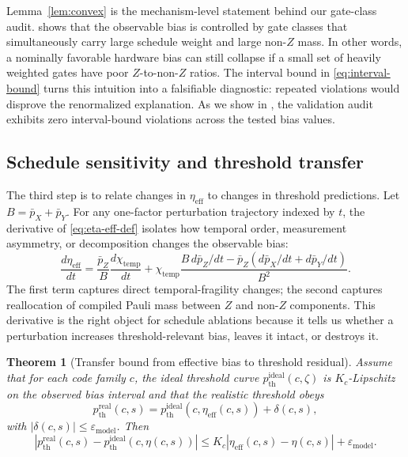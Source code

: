 \documentclass{article} %
\newtheorem{theorem}{Theorem}[section]
\begin{document}
Lemma~\ref{lem:convex} is the mechanism-level statement behind our gate-class audit.  shows that the observable bias is controlled by gate classes that simultaneously carry large schedule weight and large non-$Z$ mass. In other words, a nominally favorable hardware bias can still collapse if a small set of heavily weighted gates have poor $Z$-to-non-$Z$ ratios. The interval bound in \eqref{eq:interval-bound} turns this intuition into a falsifiable diagnostic: repeated violations would disprove the renormalized explanation. As we show in , the validation audit exhibits zero interval-bound violations across the tested bias values.

\subsection{Schedule sensitivity and threshold transfer}

The third step is to relate changes in $\eta_{\mathrm{eff}}$ to changes in threshold predictions. Let $B = \bar p_X + \bar p_Y$. For any one-factor perturbation trajectory indexed by $t$, the derivative of \eqref{eq:eta-eff-def} isolates how temporal order, measurement asymmetry, or decomposition changes the observable bias:
\begin{equation}
\label{eq:sensitivity}
\frac{d\eta_{\mathrm{eff}}}{dt}
=
\frac{\bar p_Z}{B}\frac{d\chi_{\mathrm{temp}}}{dt}
+
\chi_{\mathrm{temp}}
\frac{
B\, d\bar p_Z/dt
-
\bar p_Z \left(d\bar p_X/dt + d\bar p_Y/dt\right)
}{
B^2
}.
\end{equation}
The first term captures direct temporal-fragility changes; the second captures reallocation of compiled Pauli mass between $Z$ and non-$Z$ components. This derivative is the right object for schedule ablations because it tells us whether a perturbation increases threshold-relevant bias, leaves it intact, or destroys it.

\begin{theorem}[Transfer bound from effective bias to threshold residual]
\label{thm:transfer}
Assume that for each code family $c$, the ideal threshold curve $p_{\mathrm{th}}^{\mathrm{ideal}}(c,\zeta)$ is $K_c$-Lipschitz on the observed bias interval and that the realistic threshold obeys
\begin{equation}
\label{eq:realistic-decomposition}
p_{\mathrm{th}}^{\mathrm{real}}(c,s)
=
p_{\mathrm{th}}^{\mathrm{ideal}}\!\left(c,\eta_{\mathrm{eff}}(c,s)\right)
+
\delta(c,s),
\end{equation}
with $|\delta(c,s)| \le \varepsilon_{\mathrm{model}}$. Then
\begin{equation}
\label{eq:transfer-bound}
\left|
p_{\mathrm{th}}^{\mathrm{real}}(c,s)
-
p_{\mathrm{th}}^{\mathrm{ideal}}\!\left(c,\eta(c,s)\right)
\right|
\le
K_c \left|\eta_{\mathrm{eff}}(c,s)-\eta(c,s)\right|
+
\varepsilon_{\mathrm{model}}.
\end{equation}
\end{theorem}
\end{document}
